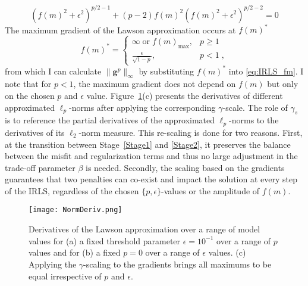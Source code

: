 \begin{equation}
(f(m)^2 + \epsilon^2)^{p/2-1} + (p - 2) f(m)^2 (f(m)^2 + \epsilon^2)^{p/2-2} = 0
\end{equation}
The maximum gradient of the Lawson approximation occurs at ${f(m)^*}$
\begin{equation}\label{mMaxGrad}
f(m)^* =
\begin{cases}
\infty \;\text{or}\; f(m)_{\text{max}},& p \geq 1 \\
\frac{\epsilon}{\sqrt{1-p}} ,&p < 1 \;,
\end{cases}
\end{equation}
from which I can calculate $\|\mathbf{g}^p\|_\infty$ by substituting ${f(m)^*}$ into \eqref{eq:IRLS_fm}. I note that for $p < 1$, the maximum gradient does not depend on $f(m)$ but only on the chosen $p$ and $\epsilon$ value.
Figure~\ref{NormDeriv}(c) presents the derivatives of different approximated $\ell_p$-norms after applying the corresponding $\gamma$-scale. The role of $\gamma_s$ is to reference the partial derivatives of the approximated $\ell_p$-norms to the derivatives of its $\ell_2$-norm measure. This re-scaling is done for two reasons. First, at the transition between Stage~\ref{Stage1} and \ref{Stage2}, it preserves the balance between the misfit and regularization terms and thus no large adjustment in the trade-off parameter $\beta$ is needed. Secondly, the scaling based on the gradients guarantees that two penalties can co-exist and impact the solution at every step of the IRLS, regardless of the chosen $\{p,\epsilon\}$-values or the amplitude of $f(m)$.
\begin{figure}
\texttt{[image: NormDeriv.png]}
\caption{Derivatives of the Lawson approximation over a range of model values for (a) a fixed threshold parameter $\epsilon=10^{-1}$ over a range of $p$ values and for (b) a fixed $p=0$ over a range of $\epsilon$ values. (c) Applying the $\gamma$-scaling to the gradients brings all maximums to be equal irrespective of $p$ and $\epsilon$.}
\label{NormDeriv}
\end{figure}

